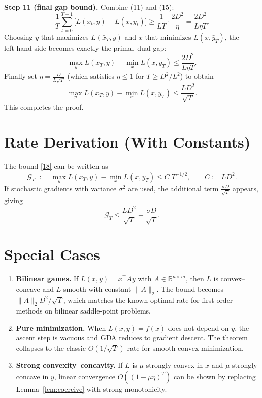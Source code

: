 \documentclass{article}
\newcommand{\R}{\mathbb{R}}
\begin{document}
\noindent\textbf{Step 11 (final gap bound).}  
Combine (11) and (15):
\[
\frac{1}{T}\sum_{t=0}^{T-1}\bigl[L(x_{t},y)-L(x,y_{t})\bigr]
\ge \frac{1}{LT}\cdot\frac{2D^{2}}{\eta}
= \frac{2D^{2}}{L\eta T}.
\tag{16}
\]
Choosing $y$ that maximizes $L(\bar{x}_{T},y)$ and $x$ that minimizes $L(x,\bar{y}_{T})$, the left‑hand side becomes exactly the primal–dual gap:
\[
\max_{y}L(\bar{x}_{T},y)-\min_{x}L(x,\bar{y}_{T})
\le \frac{2D^{2}}{L\eta T}.
\tag{17}
\]
Finally set $\eta = \frac{D}{L\sqrt{T}}$ (which satisfies $\eta\le1$ for $T\ge D^{2}/L^{2}$) to obtain
\[
\max_{y}L(\bar{x}_{T},y)-\min_{x}L(x,\bar{y}_{T})
\le \frac{LD^{2}}{\sqrt{T}}.
\tag{18}
\]
This completes the proof. \hfill\qedsymbol

\section*{Rate Derivation (With Constants)}
The bound \eqref{18} can be written as
\[
\mathcal{G}_{T}\;:=\;\max_{y}L(\bar{x}_{T},y)-\min_{x}L(x,\bar{y}_{T})
\le C\;T^{-1/2},\qquad C:=LD^{2}.
\]
If stochastic gradients with variance $\sigma^{2}$ are used, the additional term $\frac{\sigma D}{\sqrt{T}}$ appears, giving
\[
\mathcal{G}_{T}\le \frac{LD^{2}}{\sqrt{T}}+\frac{\sigma D}{\sqrt{T}}.
\]

\section*{Special Cases}\label{sec:special}
\begin{enumerate}[leftmargin=*]
  \item \textbf{Bilinear games.} If $L(x,y)=x^{\top}Ay$ with $A\in\R^{n\times m}$, then $L$ is convex–concave and $L$‑smooth with constant $\|A\|_{2}$. The bound becomes $\|A\|_{2}D^{2}/\sqrt{T}$, which matches the known optimal rate for first‑order methods on bilinear saddle‑point problems.
  \item \textbf{Pure minimization.} When $L(x,y)=f(x)$ does not depend on $y$, the ascent step is vacuous and GDA reduces to gradient descent. The theorem collapses to the classic $O(1/\sqrt{T})$ rate for smooth convex minimization.
  \item \textbf{Strong convexity–concavity.} If $L$ is $\mu$‑strongly convex in $x$ and $\mu$‑strongly concave in $y$, linear convergence $O((1-\mu\eta)^{T})$ can be shown by replacing Lemma~\ref{lem:coercive} with strong monotonicity.
\end{enumerate}
\end{document}
